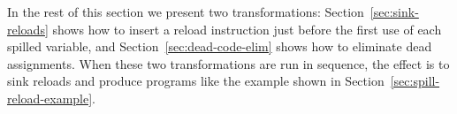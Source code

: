 \documentclass[blockstyle,preprint,nocopyrightspace]{sigplanconf}
\newcommand{\authornote}[1]{{\em #1}}
\def\authornote#1{\unskip\relax}
\newcommand{\john}[1]{\authornote{JD: #1}}
\newcommand\secref[1]{Section~\ref{sec:#1}}
\newcommand\figref[1]{Figure~\ref{fig:#1}}
\begin{document}
In the rest of this section we present two transformations:
\secref{sink-reloads} shows how to insert a reload instruction just
before the first use of each spilled variable, and
\secref{dead-code-elim} shows how to eliminate dead assignments.
When these two transformations are run in sequence, the effect is to
sink reloads and produce programs like the example shown in
\secref{spill-reload-example}. 





\end{document}
